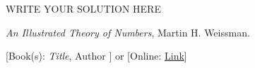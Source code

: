 \documentclass[11pt]{article}
\theoremstyle{plain}
\theoremstyle{definition}
\theoremstyle{remark}
\numberwithin{equation}{problem}
\begin{document}
\begin{solution}[of \cref{3.c}] %
WRITE YOUR SOLUTION HERE
\end{solution}\clearpage %





\begin{thebibliography}{9}  %
\emph{An Illustrated Theory of Numbers}, Martin H. Weissman.

[Book(s): \emph{Title}, Author ] or [Online: \href{http://example.com/}{Link}]
\end{thebibliography}  %
\end{document}
